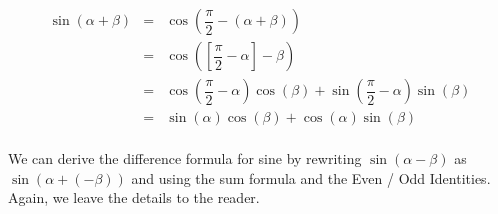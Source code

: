 \[ \begin{array}{rcl}

\sin(\alpha + \beta) & = & \cos\left( \dfrac{\pi}{2} - (\alpha + \beta) \right) \\ [10pt]
                     & = & \cos\left( \left[\dfrac{\pi}{2} - \alpha \right] - \beta \right) \\ [10pt]
                     & = & \cos\left(\dfrac{\pi}{2} - \alpha \right) \cos(\beta) + \sin\left(\dfrac{\pi}{2} - \alpha \right)\sin(\beta) \\ [10pt]
                     & = & \sin(\alpha) \cos(\beta) + \cos(\alpha) \sin(\beta) \\ \end{array} \]


We can derive the difference formula for sine by rewriting  $\sin(\alpha - \beta)$ as $\sin(\alpha + (-\beta))$ and using the sum formula and the Even / Odd Identities. Again, we leave the details to the reader.

\medskip


\medskip


